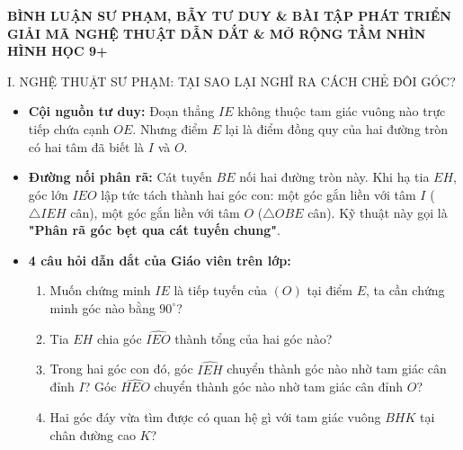 \documentclass[11pt,a4paper]{article}
\begin{document}
\newpage

\begin{center}
    {\Large\bfseries\color{blue!80!black} BÌNH LUẬN SƯ PHẠM, BẪY TƯ DUY \& BÀI TẬP PHÁT TRIỂN}\\[1.5mm]
    {\large\bfseries GIẢI MÃ NGHỆ THUẬT DẪN DẮT \& MỞ RỘNG TẦM NHÌN HÌNH HỌC 9+}
\end{center}

\vspace{1mm}

\begin{pedagogybox}{I. NGHỆ THUẬT SƯ PHẠM: TẠI SAO LẠI NGHĨ RA CÁCH CHẺ ĐÔI GÓC?}
\begin{itemize}[leftmargin=*]
    \item \textbf{Cội nguồn tư duy:} Đoạn thẳng $IE$ không thuộc tam giác vuông nào trực tiếp chứa cạnh $OE$. Nhưng điểm $E$ lại là điểm đồng quy của hai đường tròn có hai tâm đã biết là $I$ và $O$.
    \item \textbf{Đường nối phân rã:} Cát tuyến $BE$ nối hai đường tròn này. Khi hạ tia $EH$, góc lớn $\widehat{IEO}$ lập tức tách thành hai góc con: một góc gắn liền với tâm $I$ ($\triangle IEH$ cân), một góc gắn liền với tâm $O$ ($\triangle OBE$ cân). Kỹ thuật này gọi là \textbf{"Phân rã góc bẹt qua cát tuyến chung"}.
    \item \textbf{4 câu hỏi dẫn dắt của Giáo viên trên lớp:}
    \begin{enumerate}[label=\arabic*., nosep]
        \item Muốn chứng minh $IE$ là tiếp tuyến của $(O)$ tại điểm $E$, ta cần chứng minh góc nào bằng $90^\circ$?
        \item Tia $EH$ chia góc $\widehat{IEO}$ thành tổng của hai góc nào?
        \item Trong hai góc con đó, góc $\widehat{IEH}$ chuyển thành góc nào nhờ tam giác cân đỉnh $I$? Góc $\widehat{HEO}$ chuyển thành góc nào nhờ tam giác cân đỉnh $O$?
        \item Hai góc đáy vừa tìm được có quan hệ gì với tam giác vuông $BHK$ tại chân đường cao $K$?
    \end{enumerate}
\end{itemize}
\end{pedagogybox}

\vspace{1mm}
\end{document}
